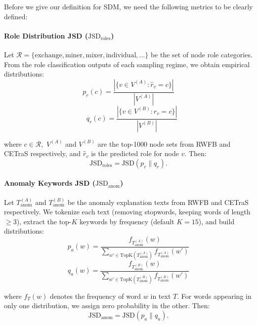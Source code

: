 \documentclass[conference]{IEEEtran}
\begin{document}
Before we give our definition for SDM, we need the following metrics to be clearly defined:
\paragraph{Role Distribution JSD ($\mathrm{JSD}_{\mathrm{roles}}$)}
Let $\mathcal{R} = \{\text{exchange}, \text{miner}, \text{mixer}, \text{individual}, \ldots\}$ be the set of node role categories. From the role classification outputs of each sampling regime, we obtain empirical distributions:
\begin{equation}
    p_r(c) = \frac{|\{v \in V^{(A)} : \hat{r}_v = c\}|}{|V^{(A)}|}
\end{equation}
\begin{equation}
    \quad
q_r(c) = \frac{|\{v \in V^{(B)} : \hat{r}_v = c\}|}{|V^{(B)}|}
\end{equation}

where $c \in \mathcal{R},$ $V^{(A)}$ and $V^{(B)}$ are the top-1000 node sets from RWFB and CETraS respectively, and $\hat{r}_v$ is the predicted role for node $v$. Then:
\[
\mathrm{JSD}_{\mathrm{roles}} = \mathrm{JSD}(p_r \parallel q_r).
\]

\paragraph{Anomaly Keywords JSD ($\mathrm{JSD}_{\mathrm{anom}}$)}
Let $T_{\mathrm{anom}}^{(A)}$ and $T_{\mathrm{anom}}^{(B)}$ be the anomaly explanation texts from RWFB and CETraS respectively. We tokenize each text (removing stopwords, keeping words of length $\geq 3$), extract the top-$K$ keywords by frequency (default $K{=}15$), and build distributions:
\begin{equation}
    p_a(w) = \frac{f_{T_{\mathrm{anom}}^{(A)}}(w)}{\sum_{w' \in \mathrm{TopK}(T_{\mathrm{anom}}^{(A)})} f_{T_{\mathrm{anom}}^{(A)}}(w')}
\end{equation}
\begin{equation}
    q_a(w) = \frac{f_{T_{\mathrm{anom}}^{(B)}}(w)}{\sum_{w' \in \mathrm{TopK}(T_{\mathrm{anom}}^{(B)})} f_{T_{\mathrm{anom}}^{(B)}}(w')}
\end{equation}




where $f_T(w)$ denotes the frequency of word $w$ in text $T$. For words appearing in only one distribution, we assign zero probability in the other. Then:
\[
\mathrm{JSD}_{\mathrm{anom}} = \mathrm{JSD}(p_a \parallel q_a).
\]
\end{document}

